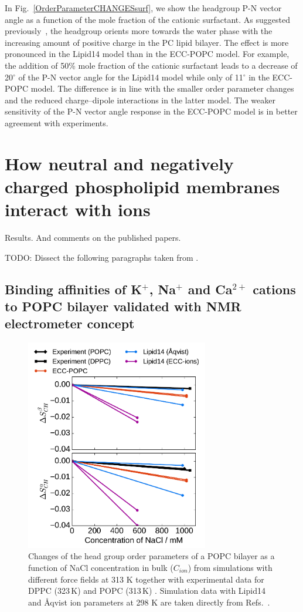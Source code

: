 In Fig.~\ref{OrderParameterCHANGESsurf}, we show the headgroup P-N vector angle as a function of the mole fraction of the cationic surfactant. As suggested previously~\citep{seelig87}, the headgroup orients more towards the water phase with the increasing amount of positive charge in the PC lipid bilayer. The effect is more pronounced in the Lipid14 model than in the ECC-POPC model.   For example, the addition of 50\% mole fraction of the cationic surfactant leads to a decrease of 20$^{\circ}$ of the P-N vector angle for the Lipid14 model while only of 11$^{\circ}$ in the ECC-POPC model. The difference is in line with the smaller order parameter changes and the reduced charge--dipole interactions in the latter model. The weaker sensitivity of the P-N vector angle response in the ECC-POPC model is in better agreement with experiments. 


\section{How neutral and negatively charged phospholipid membranes interact with ions}

  Results.
  And comments on the published papers. 

  TODO: Dissect the following paragraphs taken from \citep{melcr18}.


\subsection{Binding affinities of K$^+$, Na$^+$ and Ca$^{2+}$ cations to POPC bilayer validated with NMR electrometer concept} 
 
 
\begin{figure}[htb!] 
  \centering 
  \includegraphics[width=8.0cm]{../img/ecc_popc/OrdPars-A-B_L14-ECCL17_q80_sig89_NaCl.pdf} 
  \caption{\label{fig:delta_ordPar_NaCl} 
    Changes of the head group order parameters of a POPC bilayer as a function of NaCl concentration 
    in bulk ($C_{ion}$) from simulations with different force fields at 313 K together with  
    experimental data for DPPC (323\,K) \citep{akutsu81} and POPC (313\,K) \citep{altenbach84}. 
    Simulation data with Lipid14 and Åqvist ion parameters at 298 K are taken directly from 
    Refs.~\citep{lipid14POPC0mMNaClfiles,lipid14POPC1000mMNaClfiles}. 
  } 
\end{figure} 
 
